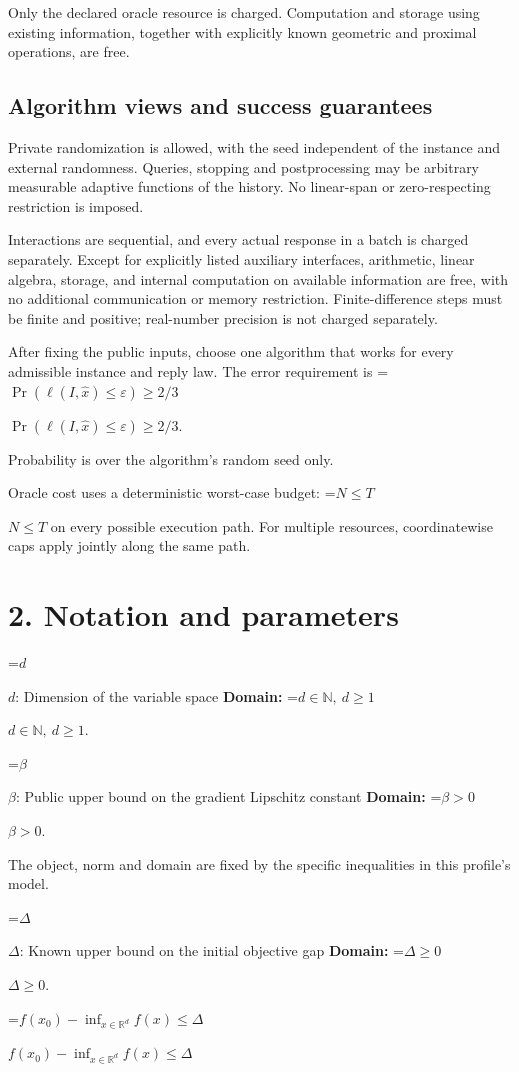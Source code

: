 \documentclass[10pt,a4paper]{article}
\newcommand{\AtlasMath}[1]{\par\begingroup\centering\setbox0=\hbox{$\displaystyle #1$}\ifdim\wd0>1.4\linewidth\typeout{ATLAS WIDE FORMULA: \the\wd0}\fi\ifdim\wd0>\linewidth\resizebox{\linewidth}{!}{\box0}\else\box0\fi\par\endgroup}
\newcommand{\AtlasInlineMath}[1]{\begingroup\setbox0=\hbox{$#1$}\ifdim\wd0>.4\linewidth\endgroup\AtlasMath{#1}\else\endgroup$#1$\fi}
\begin{document}
Only the declared oracle resource is charged. Computation and storage using existing information, together with explicitly known geometric and proximal operations, are free.

\subsection{Algorithm views and success guarantees}
Private randomization is allowed, with the seed independent of the instance and external randomness. Queries, stopping and postprocessing may be arbitrary measurable adaptive functions of the history. No linear-span or zero-respecting restriction is imposed.

Interactions are sequential, and every actual response in a batch is charged separately. Except for explicitly listed auxiliary interfaces, arithmetic, linear algebra, storage, and internal computation on available information are free, with no additional communication or memory restriction. Finite-difference steps must be finite and positive; real-number precision is not charged separately.

After fixing the public inputs, choose one algorithm that works for every admissible instance and reply law. The error requirement is \AtlasInlineMath{\Pr(\ell(I,\widehat{x})\le \varepsilon)\ge2/3}.

Probability is over the algorithm's random seed only.

Oracle cost uses a deterministic worst-case budget: \AtlasInlineMath{N\le T} on every possible execution path. For multiple resources, coordinatewise caps apply jointly along the same path.

\section{2. Notation and parameters}
\AtlasInlineMath{d}: Dimension of the variable space \textbf{Domain:} \AtlasInlineMath{d\in\mathbb{N},\ d\ge1}.

\AtlasInlineMath{\beta}: Public upper bound on the gradient Lipschitz constant \textbf{Domain:} \AtlasInlineMath{\beta>0}.

The object, norm and domain are fixed by the specific inequalities in this profile's model.

\AtlasInlineMath{\Delta}: Known upper bound on the initial objective gap \textbf{Domain:} \AtlasInlineMath{\Delta\ge0}.

\AtlasInlineMath{f(x_0)-\inf_{x\in\mathbb{R}^d}f(x)\le\Delta}
\end{document}
